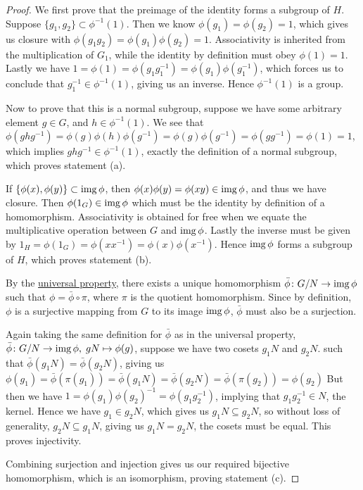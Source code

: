 \begin{proof}
    We first prove that the preimage of the identity
    forms a subgroup of \(H\).
    Suppose \(\{g_1,g_2\} \subset \phi^{-1}(1)\).
    Then we know \(\phi(g_1) = \phi(g_2) = 1\),
    which gives us closure with \(\phi(g_1 g_2) = \phi(g_1)\phi(g_2) = 1\).
    Associativity is inherited from the multiplication of \(G_1\),
    while the identity by definition must obey \(\phi(1) = 1\).
    Lastly we have \(1 = \phi(1) = \phi(g_1 g_1^{-1})
    = \phi(g_1)\phi(g_1^{-1})\),
    which forces us to conclude that \(g_1^{-1} \in \phi^{-1}(1)\),
    giving us an inverse.
    Hence \(\phi^{-1}(1)\) is a group.

    Now to prove that this is a normal subgroup,
    suppose we have some arbitrary element \(g \in G\),
    and \(h \in \phi^{-1}(1)\).
    We see that \(\phi(ghg^{-1}) = \phi(g)\phi(h)\phi(g^{-1})
    = \phi(g)\phi(g^{-1}) = \phi(gg^{-1}) = \phi(1) = 1\),
    which implies \(ghg^{-1} \in \phi^{-1}(1)\),
    exactly the definition of a normal subgroup,
    which proves statement (a).

    \medskip

    If \(\{\phi(x),\phi(y)\} \subset \operatorname{img}\phi\),
    then \(\phi(x)\phi(y) = \phi(xy) \in \operatorname{img}\phi\),
    and thus we have closure.
    Then \(\phi(1_G) \in \operatorname{img}\phi\)
    which must be the identity by definition of a homomorphism.
    Associativity is obtained for free
    when we equate the multiplicative operation
    between \(G\) and \(\operatorname{img}\phi\).
    Lastly the inverse must be given by
    \(1_H = \phi(1_G) = \phi(xx^{-1}) = \phi(x)\phi(x^{-1})\).
    Hence \(\operatorname{img}\phi\) forms a subgroup of \(H\),
    which proves statement (b).

    \medskip

    By the \hyperref[thm:univ-prop-quotient-group]{universal property},
    there exists a unique homomorphism \(\bar{\phi}\colon G/N\to\operatorname{img}\phi\)
    such that \(\phi = \bar{\phi}\circ\pi\),
    where \(\pi\) is the quotient homomorphism.
    Since by definition, \(\phi\) is a surjective mapping
    from \(G\) to its image \(\operatorname{img}\phi\),
    \(\bar{\phi}\) must also be a surjection.

    Again taking the same definition for \(\bar{\phi}\)
    as in the universal property,
    \(\bar{\phi}\colon G/N\to\operatorname{img}\phi,\;gN\mapsto\phi(g)\),
    suppose we have two cosets \(g_1 N\) and \(g_2 N\).
    such that \(\bar{\phi}(g_1 N) = \bar{\phi}(g_2 N)\),
    giving us \(\phi(g_1) = \bar{\phi}(\pi(g_1)) = \bar{\phi}(g_1 N)
    = \bar{\phi}(g_2 N) = \bar{\phi}(\pi(g_2)) = \phi(g_2)\)
    But then we have \(1 = \phi(g_1){\phi(g_2)}^{-1} = \phi(g_1 g_2^{-1})\),
    implying that \(g_1 g_2^{-1} \in N\), the kernel.
    Hence we have \(g_1 \in g_2 N\),
    which gives us \(g_1 N \subseteq g_2 N\),
    so without loss of generality, \(g_2 N \subseteq g_1 N\),
    giving us \(g_1 N = g_2 N\), the cosets must be equal.
    This proves injectivity.

    Combining surjection and injection
    gives us our required bijective homomorphism,
    which is an isomorphism,
    proving statement (c).
\end{proof}

